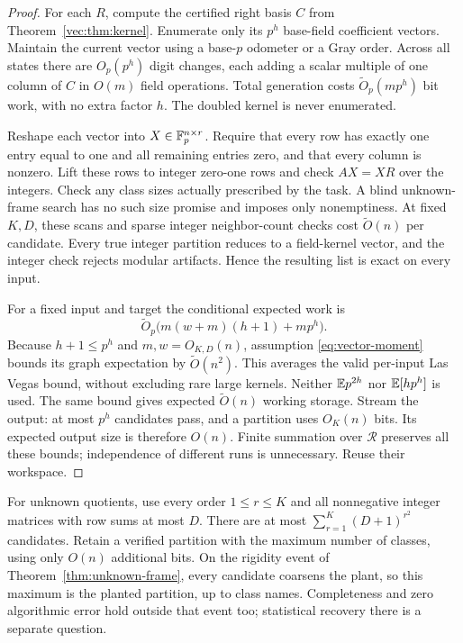 \begin{proof}
For each $R$, compute the certified right basis $C$ from
Theorem~\ref{vec:thm:kernel}. Enumerate only its $p^h$ base-field
coefficient vectors. Maintain the current vector using a base-$p$
odometer or a Gray order. Across all states there are $O_p(p^h)$
digit changes, each adding a scalar multiple of one column of $C$
in $O(m)$ field operations. Total generation costs
$\widetilde O_p(mp^h)$ bit work, with no extra factor $h$.
The doubled kernel is never enumerated.

Reshape each vector into $X\in\mathbb F_p^{n\times r}$. Require that every
row has exactly one entry equal to one and all remaining entries
zero, and that every column is nonzero. Lift these rows to integer
zero-one rows and check $AX=XR$ over the integers. Check any class
sizes actually prescribed by the task. A blind unknown-frame search
has no such size promise and imposes only nonemptiness. At fixed
$K,D$, these scans and sparse integer neighbor-count checks cost
$\widetilde O(n)$ per candidate. Every true integer partition reduces
to a field-kernel vector, and the integer check rejects modular
artifacts. Hence the resulting list is exact on every input.

For a fixed input and target the conditional expected work is
\begin{equation}\label{eq:vector-per-input}
 \widetilde O_p\bigl(m(w+m)(h+1)+mp^h\bigr).
\end{equation}
Because $h+1\le p^h$ and $m,w=O_{K,D}(n)$, assumption
\eqref{eq:vector-moment} bounds its graph expectation by
$\widetilde O(n^2)$. This averages the valid per-input Las Vegas
bound, without excluding rare large kernels. Neither
$\mathbb E p^{2h}$ nor $\mathbb E[h p^h]$ is used.
The same bound gives expected $\widetilde O(n)$ working storage.
Stream the output: at most $p^h$ candidates pass, and a partition
uses $O_K(n)$ bits. Its expected output size is therefore $O(n)$.
Finite summation over $\mathcal R$ preserves all these bounds;
independence of different runs is unnecessary. Reuse their workspace.
\end{proof}

For unknown quotients, use every order $1\le r\le K$ and all
nonnegative integer matrices with row sums at most $D$. There are
at most $\sum_{r=1}^K(D+1)^{r^2}$ candidates. Retain a verified
partition with the maximum number of classes, using only $O(n)$
additional bits. On the rigidity event of
Theorem~\ref{thm:unknown-frame}, every candidate coarsens the plant,
so this maximum is the planted partition, up to class names.
Completeness and zero algorithmic error hold outside that event too;
statistical recovery there is a separate question.

